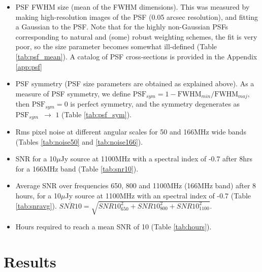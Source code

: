 \documentclass[sfheadings,a4paper,10pt,floats,floatfix]{article}
\begin{document}
\begin{itemize}
 \item PSF FWHM size (mean of the FWHM dimensions). This was measured by making high-resolution images of the PSF (0.05 arcsec
resolution), and fitting a Gaussian to the PSF. Note that for the highly non-Gaussian PSFs corresponding to natural and (some)
robust weighting schemes, the fit is very poor, so the size parameter becomes somewhat ill-defined (Table \ref{tab:psf_mean}).
A catalog of PSF cross-sections is provided in the Appendix \ref{app:psf}

 \item PSF symmetry (PSF size parameters are obtained as explained above). As a measure of PSF symmetry, we define 
$\text{PSF}_{sym}=1-\text{FWHM}_{min}/\text{FWHM}_{maj}$, then $\text{PSF}_{sym} = 0$ is perfect symmetry, and the symmetry
degenerates as $\text{PSF}_{sym}\,\,\, \rightarrow\,\,1$ (Table \ref{tab:psf_sym}).

 \item Rms pixel noise at different angular scales for 50 and 166MHz wide bands (Tables \ref{tab:noise50} and \ref{tab:noise166}).
 
 \item SNR for a 10$\mu$Jy source at 1100MHz with a spectral index of -0.7 after 8hrs for a 166MHz band (Table \ref{tab:snr10}).
 \item Average SNR over frequencies 650, 800 and 1100MHz (166MHz band)
   after 8 hours, for a 10$\mu$Jy source at 1100MHz
with an spectral index of -0.7 (Table \ref{tab:snravg}). {$\overline{SNR10}=\sqrt{SNR10_{650}^2 + SNR10_{800}^2 + SNR10_{1100}^2}$}.
 \item Hours required to reach a mean SNR of 10 (Table \ref{tab:hours}).
\end{itemize}
\section{Results}\label{sec:results}








\end{document}

